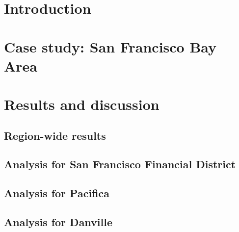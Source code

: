 \documentclass[twoside]{article}
\begin{document}

\linenumbers

\section{Introduction}
\label{sec:accIntro}



\section{Case study: San Francisco Bay Area}
\label{sec:accCase}

%

\section{Results and discussion}
\label{sec:results}

	\subsection{Region-wide results}
	\label{sec:accAll}
	
	
	
	\subsection{Analysis for San Francisco Financial District}
	\label{sec:accSF}
	
	
	
	\subsection{Analysis for Pacifica}
	\label{sec:accPacifica}
	
	
	
	\subsection{Analysis for Danville}
	\label{sec:accDanville}
	
\end{document}
